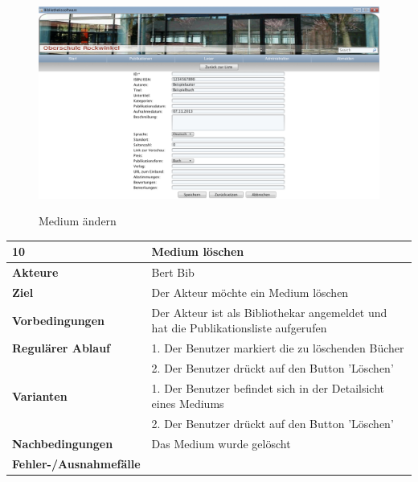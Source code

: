 \documentclass[fontsize=12pt,paper=a4,twoside]{scrartcl}
\begin{document}
\begin{figure}[htbp]
\caption{Medium ändern}
\includegraphics[width=1\textwidth]{ScreensWebsite/PublikationHinzufuegenFilled.png}
  \label{Medium aendern}
\end{figure}

\begin{table}[htbp]
\label{10}
\begin{tabular}{|l|p{10cm}|}
\hline 
\textbf{10} & \textbf{Medium löschen} \\ \hline
\textbf{Akteure} & Bert Bib\\ \hline
\textbf{Ziel} & Der Akteur möchte ein Medium löschen \\ \hline
\textbf{Vorbedingungen} & Der Akteur ist als Bibliothekar angemeldet und hat die Publikationsliste 
aufgerufen  \\ \hline
\textbf{Regulärer Ablauf} & 
1. Der Benutzer markiert die zu löschenden Bücher\\
&2. Der Benutzer drückt auf den Button 'Löschen' \\
\hline
\textbf{Varianten} & 
1. Der Benutzer befindet sich in der Detailsicht eines Mediums\\
&2. Der Benutzer drückt auf den Button 'Löschen' \\ \hline
\textbf{Nachbedingungen} & Das Medium wurde gelöscht \\ \hline
\textbf{Fehler-/Ausnahmefälle} & \\
\hline
\end{tabular}
\end{table}
\end{document}
